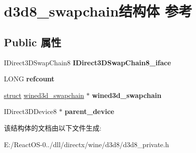 \hypertarget{structd3d8__swapchain}{}\section{d3d8\+\_\+swapchain结构体 参考}
\label{structd3d8__swapchain}
\subsection*{Public 属性}
\begin{DoxyCompactItemize}
\item 
\mbox{\label{structd3d8__swapchain_a803055dc4c733e9fd38bae30f4716e93}} 
I\+Direct3\+D\+Swap\+Chain8 {\bfseries I\+Direct3\+D\+Swap\+Chain8\+\_\+iface}
\item 
\mbox{\label{structd3d8__swapchain_a7e3aebb53194145c39c8936dc6608fff}} 
L\+O\+NG {\bfseries refcount}
\item 
\mbox{\label{structd3d8__swapchain_a87a7e65ea061d9d6b09ff83fdf27934e}} 
\hyperlink{interfacestruct}{struct} \hyperlink{structwined3d__swapchain}{wined3d\+\_\+swapchain} $\ast$ {\bfseries wined3d\+\_\+swapchain}
\item 
\mbox{\label{structd3d8__swapchain_af70b68e68b15be5148fe66cbc1998fb1}} 
I\+Direct3\+D\+Device8 $\ast$ {\bfseries parent\+\_\+device}
\end{DoxyCompactItemize}


该结构体的文档由以下文件生成\+:\begin{DoxyCompactItemize}
\item 
E\+:/\+React\+O\+S-\/0../dll/directx/wine/d3d8/d3d8\+\_\+private.\+h\end{DoxyCompactItemize}

